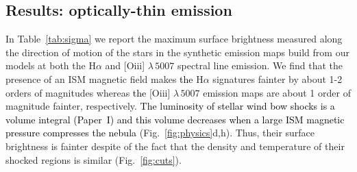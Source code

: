 \documentclass[useAMS,usenatbib]{mn2e}
\begin{document}


\subsection{Results: optically-thin emission}
\label{sect:feedback}



In Table~\ref{tab:sigma} we report the maximum surface brightness measured along
the direction of motion of the stars in the synthetic emission maps build from
our models at both the H$\alpha$ and [O{\sc iii}] $\lambda \, 5007$ spectral
line emission. We find that the presence of an ISM magnetic field makes \textcolor{black}{the}
H$\alpha$ signatures fainter by about 1-2 orders of magnitudes whereas \textcolor{black}{the}
[O{\sc iii}]  $\lambda \, 5007$ emission maps are about 1 order of magnitude
fainter, respectively. \textcolor{black}{The luminosity of stellar wind bow shocks is a volume
integral (Paper~I) and this volume decreases when a large ISM magnetic pressure 
compresses the nebula} (Fig.~\ref{fig:physics}d,h). Thus, their
surface brightness is fainter despite of the fact that the density and
temperature of their shocked regions is similar (Fig.~\ref{fig:cuts}).
\end{document}
